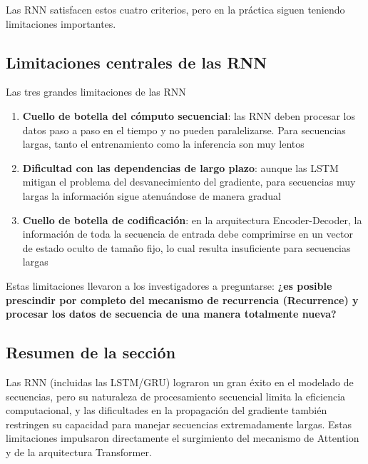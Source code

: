 Las RNN satisfacen estos cuatro criterios, pero en la práctica siguen teniendo limitaciones importantes.

\subsection{Limitaciones centrales de las RNN}

\begin{warningbox}{Las tres grandes limitaciones de las RNN}
\begin{enumerate}
    \item \textbf{Cuello de botella del cómputo secuencial}: las RNN deben procesar los datos paso a paso en el tiempo y no pueden paralelizarse. Para secuencias largas, tanto el entrenamiento como la inferencia son muy lentos
    \item \textbf{Dificultad con las dependencias de largo plazo}: aunque las LSTM mitigan el problema del desvanecimiento del gradiente, para secuencias muy largas la información sigue atenuándose de manera gradual
    \item \textbf{Cuello de botella de codificación}: en la arquitectura Encoder-Decoder, la información de toda la secuencia de entrada debe comprimirse en un vector de estado oculto de tamaño fijo, lo cual resulta insuficiente para secuencias largas
\end{enumerate}
\end{warningbox}

Estas limitaciones llevaron a los investigadores a preguntarse: \textbf{¿es posible prescindir por completo del mecanismo de recurrencia (Recurrence) y procesar los datos de secuencia de una manera totalmente nueva?}

\subsection{Resumen de la sección}

Las RNN (incluidas las LSTM/GRU) lograron un gran éxito en el modelado de secuencias, pero su naturaleza de procesamiento secuencial limita la eficiencia computacional, y las dificultades en la propagación del gradiente también restringen su capacidad para manejar secuencias extremadamente largas. Estas limitaciones impulsaron directamente el surgimiento del mecanismo de Attention y de la arquitectura Transformer.

\newpage
